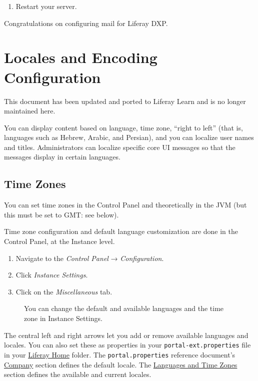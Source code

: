 \noindent\hrulefill

\begin{enumerate}
\def\labelenumi{\arabic{enumi}.}
\setcounter{enumi}{1}
\tightlist
\item
  Restart your server.
\end{enumerate}

Congratulations on configuring mail for Liferay DXP.

\chapter{Locales and Encoding
Configuration}\label{locales-and-encoding-configuration}

{This document has been updated and ported to Liferay Learn and is no
longer maintained here.}

You can display content based on language, time zone, ``right to left''
(that is, languages such as Hebrew, Arabic, and Persian), and you can
localize user names and titles. Administrators can localize specific
core UI messages so that the messages display in certain languages.

\section{Time Zones}\label{time-zones}

You can set time zones in the Control Panel and theoretically in the JVM
(but this must be set to GMT: see below).

Time zone configuration and default language customization are done in
the Control Panel, at the Instance level.

\begin{enumerate}
\def\labelenumi{\arabic{enumi}.}
\item
  Navigate to the \emph{Control Panel} → \emph{Configuration}.
\item
  Click \emph{Instance Settings}.
\item
  Click on the \emph{Miscellaneous} tab.
\end{enumerate}

\begin{figure}
\centering
{}
\caption{You can change the default and available languages and the time
zone in Instance Settings.}
\end{figure}

The central left and right arrows let you add or remove available
languages and locales. You can also set these as properties in your
\texttt{portal-ext.properties} file in your
\href{/docs/7-2/deploy/-/knowledge_base/d/liferay-home}{Liferay Home}
folder. The \texttt{portal.properties} reference document's
\href{@platform-ref@/7.2-latest/propertiesdoc/portal.properties.html\#Company}{Company}
section defines the default locale. The
\href{@platform-ref@/7.2-latest/propertiesdoc/portal.properties.html\#Languages\%20and\%20Time\%20Zones}{Languages
and Time Zones} section defines the available and current locales.

